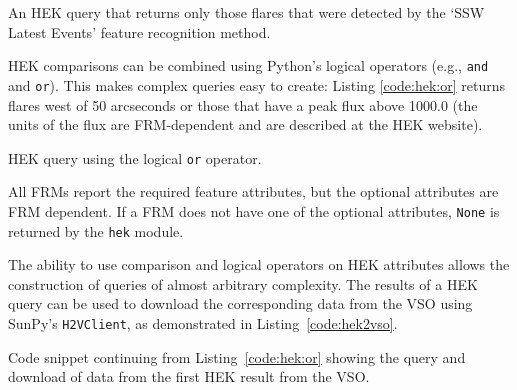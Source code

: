 \begin{listing}[H]
\caption{An HEK query that returns only those flares that were
  detected by the `SSW Latest Events' feature recognition method.}
\label{code:hek:frm}
\end{listing}

HEK comparisons can be combined using Python's logical operators (e.g., \texttt{and}
and \texttt{or}). This makes complex queries easy to create: Listing \ref{code:hek:or} 
returns flares west of 50 arcseconds or those that have a peak flux above 
1000.0 (the units of the flux are FRM-dependent and are described at the HEK 
website).
\begin{listing}[H]
\caption{HEK query using the logical \texttt{or} operator.}
\label{code:hek:or}
\end{listing}
All FRMs report the required feature attributes, but the optional attributes 
are FRM dependent.  If a FRM does not have one of the optional attributes, 
\texttt{None} is returned by the \texttt{hek} module. 

The ability to use comparison and logical operators on HEK attributes allows 
the construction of queries of almost arbitrary complexity. 
The results of a HEK query can be used to download the 
corresponding data from the VSO using SunPy's \texttt{H2VClient}, as 
demonstrated in Listing~\ref{code:hek2vso}.
\begin{listing}[H]
\caption{Code snippet continuing from Listing~\ref{code:hek:or} showing the 
query and download of data from the first HEK result from the VSO.}
\label{code:hek2vso}
\end{listing}